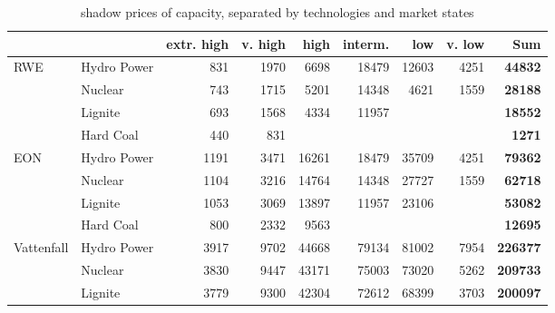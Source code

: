 \clearpage
\begin{table}[htb]
\centering
\label{tab:statlambda}
\caption{shadow prices of capacity, separated by technologies and market states}
\begin{tabular}{llrrrrrrr}
\hline
           &            & extr. high &    v. high &       high &    interm. &        low &     v. low &  {\bf Sum} \\
\hline
       RWE & Hydro Power &        831 &       1970 &       6698 &      18479 &      12603 &       4251 & {\bf 44832} \\

           &    Nuclear &        743 &       1715 &       5201 &      14348 &       4621 &       1559 & {\bf 28188} \\

           &    Lignite &        693 &       1568 &       4334 &      11957 &            &            & {\bf 18552} \\

           &  Hard Coal &        440 &        831 &            &            &            &            & {\bf 1271} \\
\hline
       EON & Hydro Power &       1191 &       3471 &      16261 &      18479 &      35709 &       4251 & {\bf 79362} \\

           &    Nuclear &       1104 &       3216 &      14764 &      14348 &      27727 &       1559 & {\bf 62718} \\

           &    Lignite &       1053 &       3069 &      13897 &      11957 &      23106 &            & {\bf 53082} \\

           &  Hard Coal &        800 &       2332 &       9563 &            &            &            & {\bf 12695} \\
\hline
Vattenfall & Hydro Power &       3917 &       9702 &      44668 &      79134 &      81002 &       7954 & {\bf 226377} \\

           &    Nuclear &       3830 &       9447 &      43171 &      75003 &      73020 &       5262 & {\bf 209733} \\

           &    Lignite &       3779 &       9300 &      42304 &      72612 &      68399 &       3703 & {\bf 200097} \\


\end{tabular}
\end{table}
